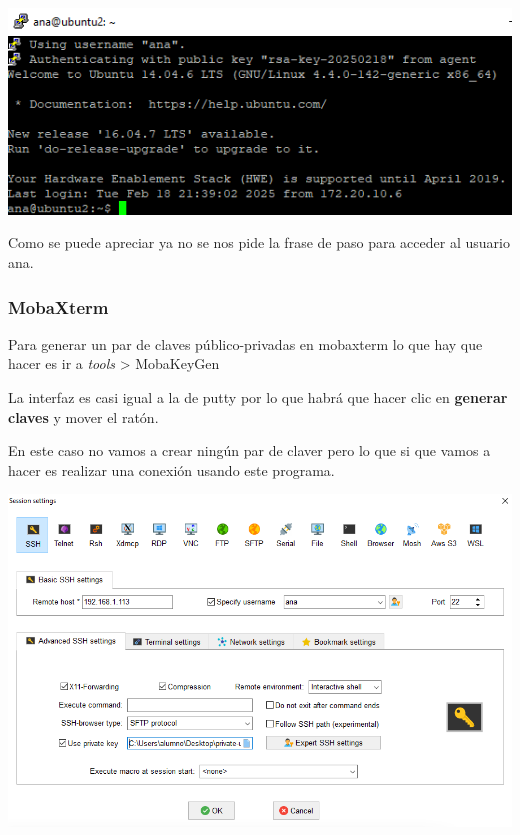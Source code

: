 \documentclass[11pt]{article}
\begin{document}
\begin{center}
\includegraphics[width=.9\linewidth]{./media/pageant-3.png}
\end{center}

Como se puede apreciar ya no se nos pide la frase de paso para acceder al usuario ana.

\subsubsection{MobaXterm}
\label{sec:org57d8fdc}
Para generar un par de claves público-privadas en mobaxterm lo que hay que hacer es ir a \emph{tools} > MobaKeyGen

La interfaz es casi igual a la de putty por lo que habrá que hacer clic en \textbf{generar claves} y mover el ratón.

En este caso no vamos a crear ningún par de claver pero lo que si que vamos a hacer es realizar una conexión usando este programa.

\begin{center}
\includegraphics[width=.9\linewidth]{./media/mobaxterm.png}
\end{center}
\end{document}
